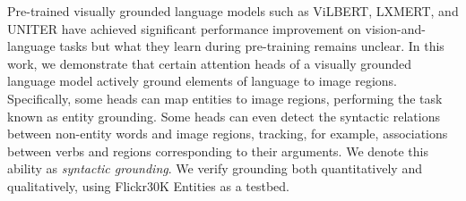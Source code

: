 Pre-trained visually grounded language models such as ViLBERT, LXMERT, and UNITER have achieved significant performance improvement on vision-and-language tasks but what they learn during pre-training remains unclear. In this work, we demonstrate that certain attention heads of a visually grounded language model actively ground elements of language to image regions. Specifically, some heads can map entities to image regions, performing the task known as entity grounding. Some heads can even detect the syntactic relations between non-entity words and image regions, tracking, for example, associations between verbs and regions corresponding to their arguments. We denote this ability as \emph{syntactic grounding}. We verify grounding both quantitatively and qualitatively, using Flickr30K Entities as a testbed.
